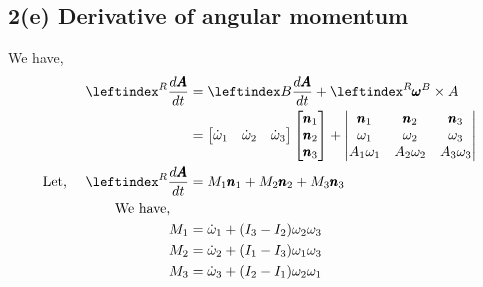 \subsection{2(e) Derivative of angular momentum}
We have,
\begin{align*}
    \lx{^R}{\frac{d \pmb A}{d t}} &= \lx{B}{\frac{d \pmb A}{dt}} + \lx{^R}{\pmb \omega}^B \times A\\
    &=\bm{\dot \omega_1 & \dot \omega_2 & \dot \omega_3} \bm{\pmb n_1 \\ \pmb n_2 \\ \pmb n_3} +
    \left| \begin{matrix} \pmb n_1 & \pmb n_2 &\pmb n_3\\
            \omega_1 & \omega_2 & \omega_3\\
            A_1\omega_1 & A_2 \omega_2 & A_3 \omega_3\\
            \end{matrix} \right|\\
    \text{Let, } \quad \lx{^R}{\frac{d \pmb A}{d t}} &= M_1 \pmb n_1 + M_2 \pmb n_2+ M_3 \pmb n_3\\
    \text{We have, } \quad &\\
    M_1 &= \dot \omega_1 + (I_3 - I_2) \omega_2 \omega_3\\
    M_2 &= \dot \omega_2 + (I_1 - I_3) \omega_1 \omega_3\\
    M_3 &= \dot \omega_3 + (I_2 - I_1) \omega_2 \omega_1\\
\end{align*}
